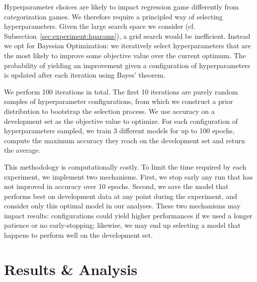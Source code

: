 \documentclass[twocolumn]{article}
\begin{document}
Hyperparameter choices are likely to impact regression game differently from categorization games. %
We therefore require a principled way of selecting hyperparameters. %
Given the large search space we consider (cf. Subsection~\ref{sec:experiment:hparams}), a grid search would be inefficient.
Instead we opt for Bayesian Optimization: we iteratively select hyperparameters that are the most likely to improve some objective value over the current optimum.
The probability of yielding an improvement given a configuration of hyperparameters is updated after each iteration using Bayes' theorem.

We perform 100 iterations in total.
The first 10 iterations are purely random samples of hyperparameter configurations, from which we construct a prior distribution to bootstrap the selection process. 
We use accuracy on a development set as the objective value to optimize.
For each configuration of hyperparameters sampled, we train 3 different models for up to 100 epochs, compute the maximum accuracy they reach on the development set and return the average.%

This methodology is computationally costly. %
To limit the time required by each experiment, we implement two mechanisms.
First, we stop early any run that has not improved in accuracy over 10 epochs.
Second, we save the model that performs best on development data at any point during the experiment, and consider only this optimal model in our analyses.
These two mechanisms may impact results: configurations could yield higher performances if we used a longer patience or no early-stopping; likewise, we may end up selecting a model that happens to perform well on the development set.

\section{Results \& Analysis} \label{sec:results}
\end{document}
